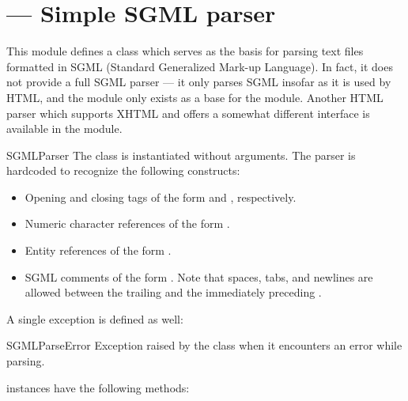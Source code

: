 \section{ ---
         Simple SGML parser}



This module defines a class  which serves as the
basis for parsing text files formatted in SGML (Standard Generalized
Mark-up Language).  In fact, it does not provide a full SGML parser
--- it only parses SGML insofar as it is used by HTML, and the module
only exists as a base for the  module.  Another
HTML parser which supports XHTML and offers a somewhat different
interface is available in the  module.

\begin{classdesc}{SGMLParser}{}
The  class is instantiated without arguments.
The parser is hardcoded to recognize the following
constructs:

\begin{itemize}
\item
Opening and closing tags of the form
 and
, respectively.

\item
Numeric character references of the form .

\item
Entity references of the form .

\item
SGML comments of the form .  Note that
spaces, tabs, and newlines are allowed between the trailing
\samp{>} and the immediately preceding \samp{--}.

\end{itemize}
\end{classdesc}

A single exception is defined as well:

\begin{excdesc}{SGMLParseError}
Exception raised by the  class when it encounters an
error while parsing.
\end{excdesc}


 instances have the following methods:


